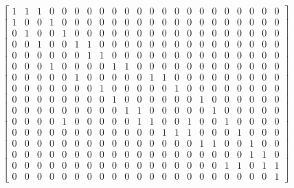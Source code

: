 \begin{equation}
	\begin{bmatrix} \label{eq:matrizInc}
		1 & 1 & 1 & 0 & 0 & 0 & 0 & 0 & 0 & 0 & 0 & 0 & 0 & 0 & 0 & 0 & 0 & 0 & 0 & 0 & 0 & 0 \\%
		1 & 0 & 0 & 1 & 0 & 0 & 0 & 0 & 0 & 0 & 0 & 0 & 0 & 0 & 0 & 0 & 0 & 0 & 0 & 0 & 0 & 0 \\%
		0 & 1 & 0 & 0 & 1 & 0 & 0 & 0 & 0 & 0 & 0 & 0 & 0 & 0 & 0 & 0 & 0 & 0 & 0 & 0 & 0 & 0 \\%
		0 & 0 & 1 & 0 & 0 & 1 & 1 & 0 & 0 & 0 & 0 & 0 & 0 & 0 & 0 & 0 & 0 & 0 & 0 & 0 & 0 & 0 \\%
		0 & 0 & 0 & 0 & 0 & 0 & 1 & 1 & 0 & 0 & 0 & 0 & 0 & 0 & 0 & 0 & 0 & 0 & 0 & 0 & 0 & 0 \\%
		0 & 0 & 0 & 1 & 0 & 0 & 0 & 0 & 1 & 1 & 0 & 0 & 0 & 0 & 0 & 0 & 0 & 0 & 0 & 0 & 0 & 0 \\%
		0 & 0 & 0 & 0 & 0 & 1 & 0 & 0 & 0 & 0 & 0 & 1 & 1 & 0 & 0 & 0 & 0 & 0 & 0 & 0 & 0 & 0 \\%
		0 & 0 & 0 & 0 & 0 & 0 & 0 & 1 & 0 & 0 & 0 & 0 & 0 & 1 & 0 & 0 & 0 & 0 & 0 & 0 & 0 & 0 \\%
		0 & 0 & 0 & 0 & 0 & 0 & 0 & 0 & 1 & 0 & 0 & 0 & 0 & 0 & 0 & 1 & 0 & 0 & 0 & 0 & 0 & 0 \\%
		0 & 0 & 0 & 0 & 0 & 0 & 0 & 0 & 0 & 1 & 1 & 0 & 0 & 0 & 0 & 0 & 1 & 0 & 0 & 0 & 0 & 0 \\%
		0 & 0 & 0 & 0 & 1 & 0 & 0 & 0 & 0 & 0 & 1 & 1 & 0 & 0 & 1 & 0 & 0 & 1 & 0 & 0 & 0 & 0 \\%
		0 & 0 & 0 & 0 & 0 & 0 & 0 & 0 & 0 & 0 & 0 & 0 & 1 & 1 & 1 & 0 & 0 & 0 & 1 & 0 & 0 & 0 \\%
		0 & 0 & 0 & 0 & 0 & 0 & 0 & 0 & 0 & 0 & 0 & 0 & 0 & 0 & 0 & 1 & 1 & 0 & 0 & 1 & 0 & 0 \\%
		0 & 0 & 0 & 0 & 0 & 0 & 0 & 0 & 0 & 0 & 0 & 0 & 0 & 0 & 0 & 0 & 0 & 0 & 0 & 1 & 1 & 0 \\%
		0 & 0 & 0 & 0 & 0 & 0 & 0 & 0 & 0 & 0 & 0 & 0 & 0 & 0 & 0 & 0 & 0 & 1 & 1 & 0 & 1 & 1 \\%
		0 & 0 & 0 & 0 & 0 & 0 & 0 & 0 & 0 & 0 & 0 & 0 & 0 & 0 & 0 & 0 & 0 & 0 & 0 & 0 & 0 & 1 %
	\end{bmatrix}
\end{equation}


